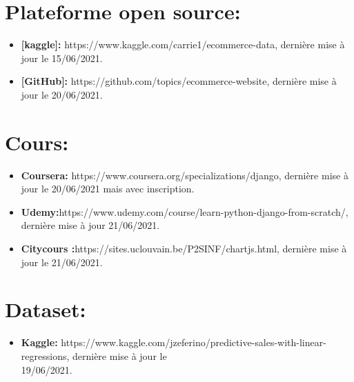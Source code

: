 \documentclass[a4paper]{report}
\begin{document}
\begin{doublespace}
\begin{doublespace}
\begin{doublespace}
\begin{doublespace}
\begin{doublespace}
\begin{doublespace}
                        \section{Plateforme open source:}
                        \begin{itemize}
                            \item \textbf{[kaggle]:} https://www.kaggle.com/carrie1/ecommerce-data, dernière mise à jour le 15/06/2021.
                            \item \textbf{[GitHub]:} https://github.com/topics/ecommerce-website, dernière mise à jour le 20/06/2021.
                        \end{itemize}
                        \section{Cours:}
                        \begin{itemize}
                            \item \textbf{Coursera:} https://www.coursera.org/specializations/django, dernière mise à jour le 20/06/2021 mais avec inscription.
                            \item\textbf{Udemy:}https://www.udemy.com/course/learn-python-django-from-scratch/, dernière mise à jour 21/06/2021.
                            \item \textbf{Citycours :}https://sites.uclouvain.be/P2SINF/chartjs.html, dernière mise à jour le 21/06/2021.
                        \end{itemize}
                        \section{Dataset:}
                        \begin{itemize}
                            \item \textbf{Kaggle:} https://www.kaggle.com/jzeferino/predictive-sales-with-linear-regressions, dernière mise à jour le\\ 19/06/2021.
                        \end{itemize}
                    \end{doublespace}
                \end{doublespace}
            \end{doublespace}
        \end{doublespace}
    \end{doublespace}
\end{doublespace}
\end{document}
